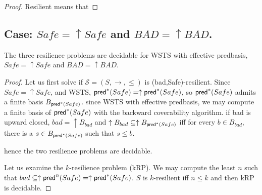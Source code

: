 \begin{proof}
Resilient means that 
\end{proof}


\subsection{Case: $Safe=\uparrow Safe$ and $BAD=\uparrow BAD$.}


\begin{theorem}\label{up-up}
The three %
resilience problems are decidable for WSTS with effective predbasis, $Safe=\uparrow Safe$
and $BAD=\uparrow BAD$.
\end{theorem}


\begin{proof}
Let us first solve if $\mathscr{S}=(S,\rightarrow,\leq)$ is %
(bad,Safe)-resilient. Since $Safe=\uparrow Safe$, and WSTS, $\textsf{pred}^*(Safe)=\uparrow \textsf{pred}^*(Safe)$, so $\textsf{pred}^*(Safe)$ admits a finite basis $B_{\textsf{pred}^*(Safe)}$. since WSTS  with effective predbasis, we may compute a finite basis of $\textsf{pred}^*(Safe)$ with the backward coverability algorithm. 
if bad  is upward closed, $bad = \uparrow B_{bad}$ and $ \uparrow B_{bad} \subseteq \uparrow B_{\textsf{pred}^*(Safe)}$ iff for every $b \in B_{bad}$, there is a $s \in B_{\textsf{pred}^*(Safe)}$ such that $s \leq b$. 
\iffalse
similar reasonning for the other case.
\fi
hence the two %
 resilience problems are decidable.

Let us examine the %
$k$-resilience problem (kRP). We may compute the least $n$ such that $bad \subseteq \uparrow \textsf{pred}^n(Safe)=  \uparrow \textsf{pred}^*(Safe)$. $S$ is %
$k$-resilient iff $n \leq k$ 
and then kRP is decidable.
\end{proof}

